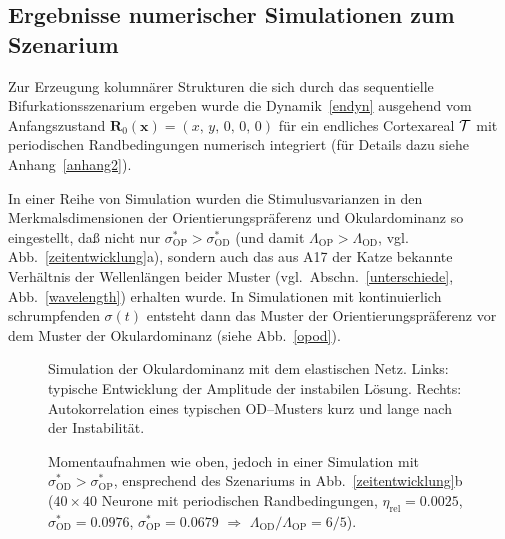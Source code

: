 \subsection{Ergebnisse numerischer Simulationen zum Szenarium}
\label{numerg}

Zur Erzeugung kolumnärer Strukturen die sich durch das sequentielle
Bifurkationsszenarium ergeben wurde die Dynamik~\eqref{endyn} ausgehend vom
Anfangszustand $\mathbf{R}_0(\mathbf{x}) = (x,\, y,\, 0,\, 0,\, 0) $ für
ein endliches Cortexareal $\cal T$ mit periodischen Randbedingungen
numerisch integriert (für Details dazu siehe Anhang~\ref{anhang2}).

In einer Reihe von Simulation wurden die Stimulusvarianzen in den
Merkmalsdimensionen der Orientierungspräferenz und Okulardominanz so
eingestellt, daß nicht nur $\sigma^\ast_{\text{OP}}>\sigma^\ast_{\text{OD}}$
(und damit $\Lambda_{\text{OP}} > \Lambda_{\text{OD}}$,
vgl. Abb.~\ref{zeitentwicklung}a), sondern auch
das aus A17 der Katze bekannte Verhältnis der Wellenlängen beider
Muster (vgl.~Abschn.~\ref{unterschiede}, Abb.~\ref{wavelength})
erhalten wurde. In Simulationen mit kontinuierlich schrumpfenden
$\sigma(t)$ entsteht dann das Muster der Orientierungspräferenz vor dem
Muster der Okulardominanz (siehe Abb.~\ref{opod}).

\begin{figure}[h!]
    \centering
    \caption{Simulation der Okulardominanz mit dem elastischen Netz. Links:
    typische Entwicklung der Amplitude der instabilen Lösung. Rechts:
    Autokorrelation eines typischen OD--Musters kurz und lange nach der
    Instabilität.}
    \label{umordnung}
\end{figure}


\begin{figure}[p]
    \begin{sideways}
    \end{sideways}
    \caption{Momentaufnahmen der koordinierten Entwicklung von Okular\-do\-mi\-nanz--
    und Ori\-en\-tie\-rungs\-karten für
        $\sigma^\ast_{\text{OP}}>\sigma^\ast_{\text{OD}}$ (Szenarium
        Abb.~\ref{zeitentwicklung}a). Die Farb-- / Grau\-wert\-intensität spiegelt
        die Amplitude der Strukturen wieder ($40\times 40$ Neurone mit periodischen
        Randbedingungen, $\eta_{\text{rel}}=0.0025$,
        $\sigma^\ast_{\text{OD}}=0.0837$, $\sigma^\ast_{\text{OP}}=0.1189$
        $\Longrightarrow$ $\Lambda_{\text{OD}}/\Lambda_{\text{OP}}=4/5$).}
    \label{opod}
    \begin{sideways}
    \end{sideways}
    \caption{Momentaufnahmen wie oben, jedoch in einer Simulation mit
        $\sigma^\ast_{\text{OD}}>\sigma^\ast_{\text{OP}}$, ensprechend des Szenariums in
        Abb.~\ref{zeitentwicklung}b ($40\times 40$ Neurone mit
        periodischen Randbedingungen, $\eta_{\text{rel}}= 0.0025$,
        $\sigma^\ast_{\text{OD}}=0.0976$, $\sigma^\ast_{\text{OP}}=0.0679$
        $\Longrightarrow$ $\Lambda_{\text{OD}}/\Lambda_{\text{OP}}=6/5$).}
    \label{odop}
\end{figure}

